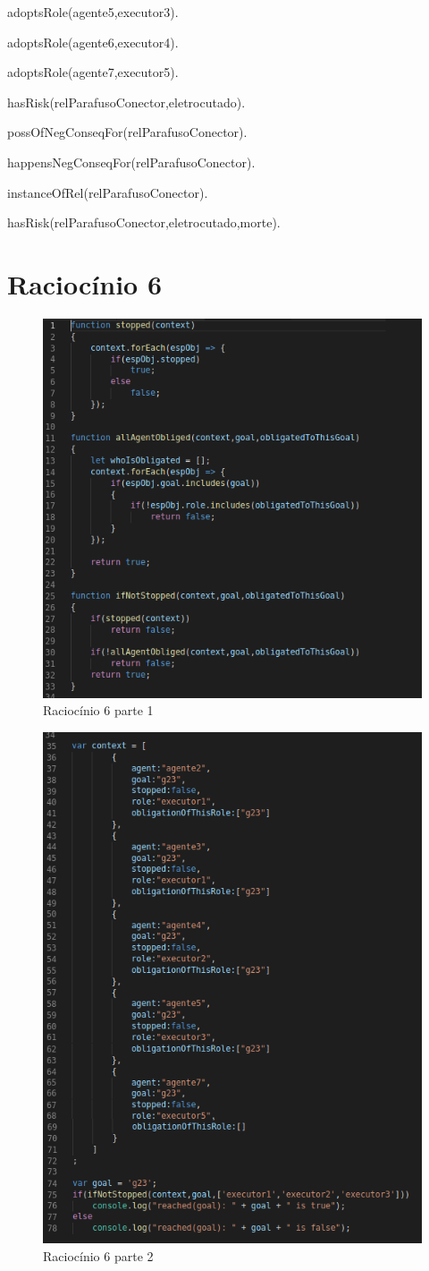 adoptsRole(agente5,executor3).

adoptsRole(agente6,executor4).

adoptsRole(agente7,executor5).

hasRisk(relParafusoConector,eletrocutado).

possOfNegConseqFor(relParafusoConector).

happensNegConseqFor(relParafusoConector).

instanceOfRel(relParafusoConector).

hasRisk(relParafusoConector,eletrocutado,morte).

\section{Raciocínio 6}


\begin{figure}[H]
  \centering
  \includegraphics[width=0.8\linewidth]{figure/algjs} 
  \caption{Raciocínio 6 parte 1}
  \label{atividiagram2}
\end{figure}


\begin{figure}[H]
  \centering
  \includegraphics[width=0.8\linewidth]{figure/algjs2} 
  \caption{Raciocínio 6 parte 2}
  \label{atividiagram2}
\end{figure}
